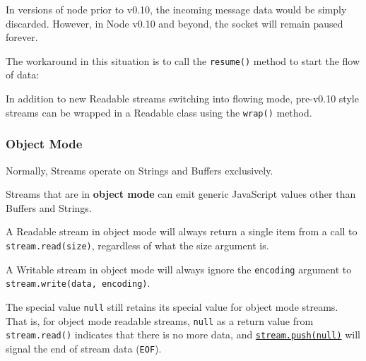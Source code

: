 In versions of node prior to v0.10, the incoming message data would be
simply discarded. However, in Node v0.10 and beyond, the socket will
remain paused forever.

The workaround in this situation is to call the \texttt{resume()} method
to start the flow of data:

\begin{Shaded}
\begin{Highlighting}[]
\NormalTok{(}

  \NormalTok{(}\NormalTok{, }\NormalTok{() \{}
    \NormalTok{(}\NormalTok{);}
  \NormalTok{\});}

  \NormalTok{();}

\NormalTok{(}\NormalTok{);}
\end{Highlighting}
\end{Shaded}

In addition to new Readable streams switching into flowing mode,
pre-v0.10 style streams can be wrapped in a Readable class using the
\texttt{wrap()} method.

\subsubsection{Object Mode}\label{object-mode}

Normally, Streams operate on Strings and Buffers exclusively.

Streams that are in \textbf{object mode} can emit generic JavaScript
values other than Buffers and Strings.

A Readable stream in object mode will always return a single item from a
call to \texttt{stream.read(size)}, regardless of what the size argument
is.

A Writable stream in object mode will always ignore the
\texttt{encoding} argument to \texttt{stream.write(data,\ encoding)}.

The special value \texttt{null} still retains its special value for
object mode streams. That is, for object mode readable streams,
\texttt{null} as a return value from \texttt{stream.read()} indicates
that there is no more data, and
\hyperref[streamux5freadableux5fpushux5fchunkux5fencoding]{\texttt{stream.push(null)}}
will signal the end of stream data (\texttt{EOF}).

